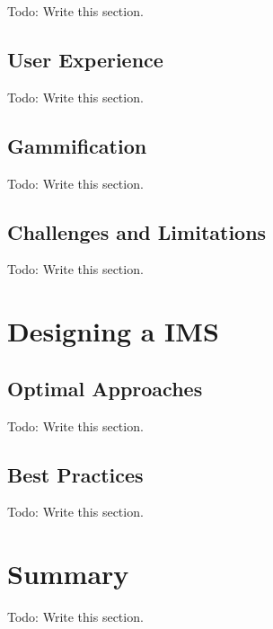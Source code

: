 Todo: Write this section.

\subsection{User Experience}

Todo: Write this section.

\subsection{Gammification}

Todo: Write this section.

\subsection{Challenges and Limitations}

Todo: Write this section.

\section{Designing a IMS}

\subsection{Optimal Approaches}

Todo: Write this section.

\subsection{Best Practices}

Todo: Write this section.

\section{Summary}

Todo: Write this section.